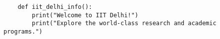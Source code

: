 
\begin{verbatim}
    def iit_delhi_info():
        print("Welcome to IIT Delhi!")
        print("Explore the world-class research and academic programs.")
\end{verbatim}
